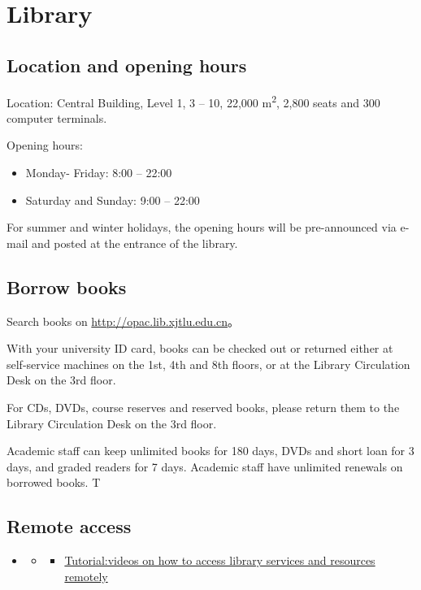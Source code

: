 \documentclass[
]{book}
\providecommand{\tightlist}{%
  \setlength{\itemsep}{0pt}\setlength{\parskip}{0pt}}
\newenvironment{rmdblock}[1]
  {\begin{shaded*}
  \begin{itemize}
  \renewcommand{\labelitemi}{
    \raisebox{-.7\height}[0pt][0pt]{
      {\setkeys{Gin}{width=2em,keepaspectratio}\texttt{[image: image/\#1]}}
    }
  }
  \item
  }
  {
  \end{itemize}
  \end{shaded*}
  }
\newenvironment{rmdvd}
  {\begin{rmdblock}{vd}}
  {\end{rmdblock}}
\begin{document}
\hypertarget{library}{%
\chapter{Library}\label{library}}

\hypertarget{location-and-opening-hours}{%
\section{Location and opening hours}\label{location-and-opening-hours}}

Location: Central Building, Level 1, 3 -- 10, 22,000 m\textsuperscript{2}, 2,800 seats and 300 computer terminals.

Opening hours:

\begin{itemize}
\item
  Monday- Friday: 8:00 -- 22:00
\item
  Saturday and Sunday: 9:00 -- 22:00
\end{itemize}

For summer and winter holidays, the opening hours will be pre-announced via e-mail and posted at the entrance of the library.

\hypertarget{borrow-books}{%
\section{Borrow books}\label{borrow-books}}

Search books on \url{http://opac.lib.xjtlu.edu.cn}。

With your university ID card, books can be checked out or returned either at self-service machines on the 1st, 4th and 8th floors, or at the Library Circulation Desk on the 3rd floor.

For CDs, DVDs, course reserves and reserved books, please return them to the Library Circulation Desk on the 3rd floor.

Academic staff can keep unlimited books for 180 days, DVDs and short loan for 3 days, and graded readers for 7 days. Academic staff have unlimited renewals on borrowed books. T

\hypertarget{remote-access}{%
\section{Remote access}\label{remote-access}}

\begin{rmdvd}
\begin{rmdvd}

\begin{itemize}
\tightlist
\item
  \href{https://box.xjtlu.edu.cn/smart-link/9d8e7934-d6eb-4400-9285-8f6c14933ed9/}{Tutorial:videos on how to access library services and resources remotely}
\end{itemize}

\end{rmdvd}
\end{rmdvd}
\end{document}
